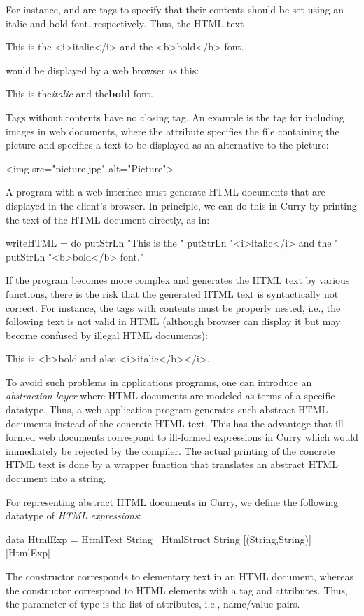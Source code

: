 For instance,  and  are tags to specify that
their contents should be set using an italic and bold font, respectively.
Thus, the HTML text
\begin{curry}
This is the <i>italic</i> and the <b>bold</b> font.
\end{curry}
would be displayed by a web browser as this:
\begin{prog}
{\rm This is the{\it italic} and the{\bf bold} font.}
\end{prog}
Tags without contents have no closing tag. An example
is the tag for including images in web documents, where the
attribute  specifies the file containing the picture
and  specifies a text to be displayed as an alternative
to the picture:
\begin{curry}
<img src="picture.jpg" alt="Picture">
\end{curry}
A program with a web interface must generate HTML documents
that are displayed in the client's browser.
In principle, we can do this in Curry by printing
the text of the HTML document directly, as in:
\begin{curry}
writeHTML = do
  putStrLn "This is the "
  putStrLn "<i>italic</i> and the "
  putStrLn "<b>bold</b> font."
\end{curry}
If the program becomes more complex and generates the HTML text
by various functions, there is the risk that the generated HTML text
is syntactically not correct. For instance, the tags with contents
must be properly nested, i.e., the following text is not valid in HTML
(although browser can display it but may become confused by illegal
HTML documents):
\begin{curry}
This is <b>bold and also <i>italic</b></i>.
\end{curry}
%
To avoid such problems in applications programs,
one can introduce an \emph{abstraction layer}
where HTML documents are modeled as terms of
a specific datatype.
Thus, a web application program generates such abstract HTML documents
instead of the concrete HTML text.
This has the advantage that ill-formed web documents correspond
to ill-formed expressions in Curry which would immediately be rejected
by the compiler. The actual printing of the concrete HTML text
is done by a wrapper function that translates an abstract HTML document
into a string.

For representing abstract HTML documents in Curry,
we define the following datatype of
\emph{HTML expressions}:
\begin{curry}
data HtmlExp = HtmlText   String                              
             | HtmlStruct String [(String,String)] [HtmlExp]
\end{curry}
%
The constructor  corresponds to elementary text
in an HTML document, whereas the constructor 
correspond to HTML elements with a tag and attributes.
Thus, the parameter of type  is the list of
attributes, i.e., name/value pairs.

